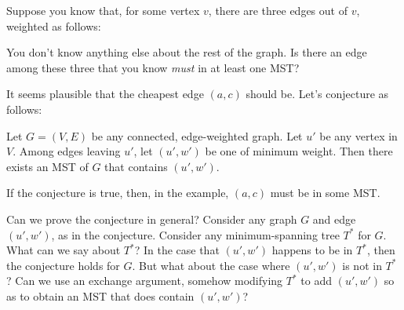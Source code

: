 Suppose you know that, for some vertex $v$, there are three edges out of $v$,
weighted as follows:


\begin{center}
\end{center}

You don't know anything else about the rest of the graph.
Is there an edge among these three that you know \emph{must} in at least one MST?

It seems plausible that the cheapest edge $(a, c)$ should be.  Let's conjecture as follows:

\newcommand{\PRIMRULE}{
  Let $G=(V,E)$ be any connected, edge-weighted graph.
  Let $u'$ be any vertex in $V$.
  Among edges leaving $u'$, let $(u', w')$ be one of minimum weight.
  Then there exists an MST of $G$ that contains $(u', w')$.
}

\begin{conjecture}\label{greedy: conj: Prim} \PRIMRULE
 \end{conjecture}

If the conjecture is true, then, in the example, $(a, c)$ must be in some MST.

Can we prove the conjecture in general?
Consider any graph $G$ and edge $(u', w')$, as in the conjecture.
Consider any minimum-spanning tree $T^*$ for $G$.
What can we say about $T^*$?
In the case that $(u', w')$ happens to be in $T^*$, then the conjecture holds for $G$.
But what about the case where $(u', w')$ is not in $T^*$?
Can we use an exchange argument,
somehow modifying $T^*$ to add $(u', w')$ 
so as to obtain an MST that does contain $(u',w')$?

